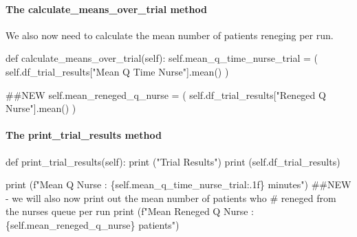 \documentclass[
  letterpaper,
  DIV=11,
  numbers=noendperiod]{scrreprt}
\let\oldparagraph\paragraph
\renewcommand{\paragraph}[1]{\oldparagraph{#1}\mbox{}}
\newenvironment{Shaded}{}{}
\newcommand{\BuiltInTok}[1]{\textcolor[rgb]{0.84,0.23,0.29}{#1}}
\newcommand{\CommentTok}[1]{\textcolor[rgb]{0.42,0.45,0.49}{#1}}
\newcommand{\KeywordTok}[1]{\textcolor[rgb]{0.84,0.23,0.29}{#1}}
\newcommand{\NormalTok}[1]{\textcolor[rgb]{0.14,0.16,0.18}{#1}}
\newcommand{\OperatorTok}[1]{\textcolor[rgb]{0.14,0.16,0.18}{#1}}
\newcommand{\SpecialCharTok}[1]{\textcolor[rgb]{0.00,0.36,0.77}{#1}}
\newcommand{\SpecialStringTok}[1]{\textcolor[rgb]{0.01,0.18,0.38}{#1}}
\newcommand{\StringTok}[1]{\textcolor[rgb]{0.01,0.18,0.38}{#1}}
\newcommand{\VariableTok}[1]{\textcolor[rgb]{0.89,0.38,0.04}{#1}}
\begin{document}
\paragraph{The calculate\_means\_over\_trial
method}\label{the-calculate_means_over_trial-method}

We also now need to calculate the mean number of patients reneging per
run.

\begin{Shaded}
\begin{Highlighting}[]
\KeywordTok{def}\NormalTok{ calculate\_means\_over\_trial(}\VariableTok{self}\NormalTok{):}
    \VariableTok{self}\NormalTok{.mean\_q\_time\_nurse\_trial }\OperatorTok{=}\NormalTok{ (}
        \VariableTok{self}\NormalTok{.df\_trial\_results[}\StringTok{"Mean Q Time Nurse"}\NormalTok{].mean()}
\NormalTok{    )}

    \CommentTok{\#\#NEW}
    \VariableTok{self}\NormalTok{.mean\_reneged\_q\_nurse }\OperatorTok{=}\NormalTok{ (}
        \VariableTok{self}\NormalTok{.df\_trial\_results[}\StringTok{"Reneged Q Nurse"}\NormalTok{].mean()}
\NormalTok{    )}
\end{Highlighting}
\end{Shaded}

\paragraph{The print\_trial\_results
method}\label{the-print_trial_results-method}

\begin{Shaded}
\begin{Highlighting}[]
\KeywordTok{def}\NormalTok{ print\_trial\_results(}\VariableTok{self}\NormalTok{):}
    \BuiltInTok{print}\NormalTok{ (}\StringTok{"Trial Results"}\NormalTok{)}
    \BuiltInTok{print}\NormalTok{ (}\VariableTok{self}\NormalTok{.df\_trial\_results)}

    \BuiltInTok{print}\NormalTok{ (}\SpecialStringTok{f"Mean Q Nurse : }\SpecialCharTok{\{}\VariableTok{self}\SpecialCharTok{.}\NormalTok{mean\_q\_time\_nurse\_trial}\SpecialCharTok{:.1f\}}\SpecialStringTok{ minutes"}\NormalTok{)}
    \CommentTok{\#\#NEW {-} we will also now print out the mean number of patients who}
    \CommentTok{\# reneged from the nurse\textquotesingle{}s queue per run}
    \BuiltInTok{print}\NormalTok{ (}\SpecialStringTok{f"Mean Reneged Q Nurse : }\SpecialCharTok{\{}\VariableTok{self}\SpecialCharTok{.}\NormalTok{mean\_reneged\_q\_nurse}\SpecialCharTok{\}}\SpecialStringTok{ patients"}\NormalTok{)}
\end{Highlighting}
\end{Shaded}
\end{document}
